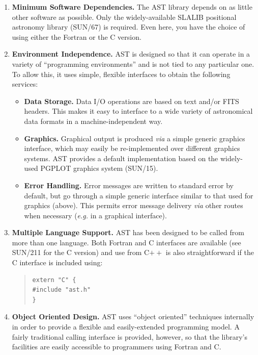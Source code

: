 \documentclass[twoside,11pt]{article}
\newcommand{\xref}[3]{#1}
\begin{document}
\begin{enumerate}
\item {\bf{Minimum Software Dependencies.}}
The AST library depends on as little other software as possible. Only
the widely-available SLALIB positional astronomy library
(\xref{SUN/67}{sun67}{}) is required. Even here, you have the choice
of using either the Fortran or the C version.

\item {\bf{Environment Independence.}}
AST is designed so that it can operate in a variety of ``programming
environments'' and is not tied to any particular one. To allow this,
it uses simple, flexible interfaces to obtain the following services:

\begin{itemize}
\item {\bf{Data Storage.}} Data I/O operations are based on text
and/or FITS headers. This makes it easy to interface to a wide variety
of astronomical data formats in a machine-independent way.

\item {\bf{Graphics.}} Graphical output is produced {\em{via}} a
simple generic graphics interface, which may easily be re-implemented
over different graphics systems. AST provides a default implementation
based on the widely-used PGPLOT graphics system
(\xref{SUN/15}{sun15}{}).

\item {\bf{Error Handling.}} Error messages are written to standard
error by default, but go through a simple generic interface similar to
that used for graphics (above). This permits error message delivery
{\em{via}} other routes when necessary ({\em{e.g.}} in a graphical
interface).
\end{itemize}

\item {\bf{Multiple Language Support.}}
AST has been designed to be called from more than one language.
Both Fortran and C interfaces are available (see
\xref{SUN/211}{sun211}{} for the C version)
and use from C$++$ is also straightforward if the C interface is
included using:

\begin{quote}
\small
\begin{verbatim}
extern "C" {
#include "ast.h"
}
\end{verbatim}
\normalsize
\end{quote}

\item {\bf{Ob\mbox{}ject Oriented Design.}}
AST uses ``object oriented'' techniques internally in order to provide
a flexible and easily-extended programming model.  A fairly
traditional calling interface is provided, however, so that the
library's facilities are easily accessible to programmers using
Fortran and C.


\end{enumerate}
\end{document}
